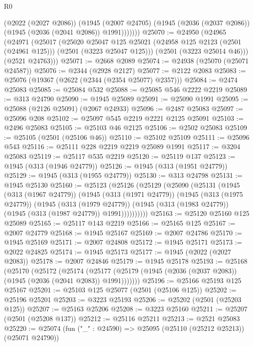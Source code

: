 \begin{lexlean}{R0}
\begin{coremodule}
            (@2022 (@2027 @2086))
            (@1945
              (@2007 @24705)
              (@1945 (@2036 (@2037 @2086)) (@1945 (@2036 (@2041 @2086)) @1991)))))))
@25070 := @24950
    (@24965
      (@24971
        (@25017
          (@25020
            @25047
            @125
            @25021
            (@24958 @125 @2123 (@2501 (@24961 @125)))
            (@2501 (@3223 @25047 @125)))
          (@2501 (@3223 @25014 @46)))
        (@2521 @24763)))
@25071 := @2668 @2089
@25074 := @24938 (@25070 (@25071 @24587))
@25076 := @2344 (@2928 @2127)
@25077 := @2122 @2083
@25083 := @25076 (@19367 (@2622 (@2344 (@2354 @25077) @2357)))
@25084 := @2474 @25083
@25085 := @25084 @532
@25088 := @25085 @546 @2222 @2219
@25089 := @313 @24790
@25090 := @1945 @25089
@25091 := @25090 @1991
@25095 := @25088 (@2126 @25091) (@2067 @24933)
@25096 := @2487 @25083
@25097 := @25096 @208
@25102 := @25097 @545 @2219 @2221 @2125 @25091
@25103 := @2496 @25083
@25105 := @25103 @46 @2125
@25106 := @2502 @25083
@25109 := @25105 (@2501 (@25106 @46))
@25110 := @25102 @25109
@25111 := @25096 @543
@25116 := @25111 @228 @2219 @2219 @25089 @1991
@25117 := @3204 @25083
@25119 := @25117 @535 @2219
@25120 := @25119 @137
@25123 := @1945 (@313 (@1946 @24779))
@25126 := @1945 (@313 (@1951 @24779))
@25129 := @1945 (@313 (@1955 @24779))
@25130 := @313 @24798
@25131 := @1945 @25130
@25160 := @25123
    (@25126
      (@25129
        (@25090
          (@25131
            (@1945
              (@313 (@1967 @24779))
              (@1945
                (@313 (@1971 @24779))
                (@1945
                  (@313 (@1975 @24779))
                  (@1945
                    (@313 (@1979 @24779))
                    (@1945 (@313 (@1983 @24779)) (@1945 (@313 (@1987 @24779)) @1991))))))))))
@25163 := @25120 @25160 @125 @25089
@25165 := @25117 @143 @2219
@25166 := @25165 @125
@25167 := @2007 @24779
@25168 := @1945 @25167
@25169 := @2007 @24786
@25170 := @1945 @25169
@25171 := @2007 @24808
@25172 := @1945 @25171
@25173 := @2022 @24825
@25174 := @1945 @25173
@25177 := @1945 (@2022 (@2027 @2083))
@25178 := @2007 @24846
@25179 := @1945 @25178
@25193 := @25168
    (@25170
      (@25172
        (@25174
          (@25177 (@25179 (@1945 (@2036 (@2037 @2083)) (@1945 (@2036 (@2041 @2083)) @1991)))))))
@25196 := @25166 @25193 @125 @25167
@25201 := @25103 @125 @25077 (@2501 (@25106 @125))
@25202 := @25196 @25201
@25203 := @3223 @25193
@25206 := @25202 (@2501 (@25203 @125))
@25207 := @25163 @25206
@25208 := @3223 @25160
@25211 := @25207 (@2501 (@25208 @137))
@25212 := @25116 @25211
@25213 := @2521 @25083
@25220 := @25074 (fun ("_" : @24590) => @25095 (@25110 (@25212 @25213)) (@25071 @24790))

\end{coremodule}
\end{lexlean}
